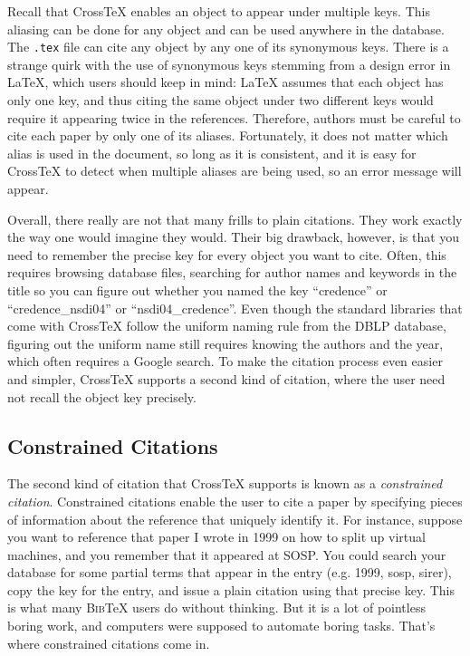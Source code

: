 \documentclass{article}
\newcommand{\XTX}{Cross\TeX}
\newcommand{\BibTeX}{\textsc{Bib}\TeX}
\begin{document}
Recall that \XTX{} enables an object to appear under multiple keys.
This aliasing can be done for any object and can be used anywhere in the
database. The \texttt{.tex} file can cite any object by any one of its
synonymous keys. There is a strange quirk with the use of synonymous
keys stemming from a design error in \LaTeX{}, which users should
keep in mind: \LaTeX{} assumes that each object has only one key, and
thus citing the same object under two different keys would require it
appearing twice in the references.  Therefore, authors must be careful
to cite each paper by only one of its aliases.  Fortunately, it does not
matter which alias is used in the document, so long as it is consistent,
and it is easy for \XTX{} to detect when multiple aliases are being used,
so an error message will appear.

Overall, there really are not that many frills to plain citations. They
work exactly the way one would imagine they would. Their big drawback,
however, is that you need to remember the precise key for every
object you want to cite. Often, this requires browsing database files,
searching for author names and keywords in the title so you can figure
out whether you named the key ``credence'' or ``credence\_nsdi04'' or
``nsdi04\_credence''. Even though the standard libraries that come with
\XTX{} follow the uniform naming rule from the DBLP database, figuring
out the uniform name still requires knowing the authors and the year,
which often requires a Google search.  To make the citation process
even easier and simpler, \XTX{} supports a second kind of citation,
where the user need not recall the object key precisely.

\subsection{Constrained Citations}

The second kind of citation that \XTX{} supports is known as a
\textit{constrained citation}.  Constrained citations enable the user
to cite a paper by specifying pieces of information about the reference
that uniquely identify it. For instance, suppose you want to reference
that paper I wrote in 1999 on how to split up virtual machines, and
you remember that it appeared at SOSP. You could search your database
for some partial terms that appear in the entry (e.g. 1999, sosp,
sirer), copy the key for the entry, and issue a plain citation using
that precise key. This is what many \BibTeX{} users do without thinking.
But it is a lot of pointless boring work, and computers were supposed
to automate boring tasks. That's where constrained citations come in.
\end{document}

